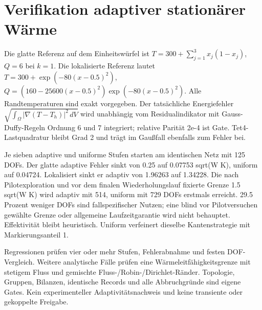 \chapter{Verifikation adaptiver stationärer Wärme}\label{vv:adaptive}
Die glatte Referenz auf dem Einheitswürfel ist
\(T=300+\sum_{j=1}^3 x_j(1-x_j)\), \(Q=6\) bei \(k=1\).
Die lokalisierte Referenz lautet \(T=300+\exp(-80(x-0.5)^2)\),
\(Q=(160-25600(x-0.5)^2)\exp(-80(x-0.5)^2)\).
Alle Randtemperaturen sind exakt vorgegeben. Der tatsächliche Energiefehler
\(\sqrt{\int_\Omega |\nabla(T-T_h)|^2\,dV}\) wird unabhängig vom Residualindikator
mit Gauss-Duffy-Regeln Ordnung 6 und 7 integriert; relative Parität 2e-4 ist Gate.
Tet4-Lastquadratur bleibt Grad 2 und trägt im Gaußfall ebenfalls zum Fehler bei.

Je sieben adaptive und uniforme Stufen starten am identischen Netz mit 125 DOFs.
Der glatte adaptive Fehler sinkt von 0.25 auf 0.07753 sqrt(W K), uniform auf 0.04724.
Lokalisiert sinkt er adaptiv von 1.96263 auf 1.34228. Die nach Pilotexploration
und vor dem finalen Wiederholungslauf fixierte Grenze 1.5 sqrt(W K) wird adaptiv
mit 514, uniform mit 729 DOFs erstmals erreicht. 29.5 Prozent weniger DOFs sind
fallspezifischer Nutzen; eine blind vor Pilotversuchen gewählte Grenze oder
allgemeine Laufzeitgarantie wird nicht behauptet. Effektivität bleibt heuristisch.
Uniform verfeinert dieselbe Kantenstrategie mit Markierungsanteil 1.

Regressionen prüfen vier oder mehr Stufen, Fehlerabnahme und festen DOF-Vergleich.
Weitere analytische Fälle prüfen eine Wärmeleitfähigkeitsgrenze mit stetigem
Fluss und gemischte Fluss-/Robin-/Dirichlet-Ränder. Topologie, Gruppen, Bilanzen,
identische Records und alle Abbruchgründe sind eigene Gates. Kein experimenteller
Adaptivitätsnachweis und keine transiente oder gekoppelte Freigabe.
